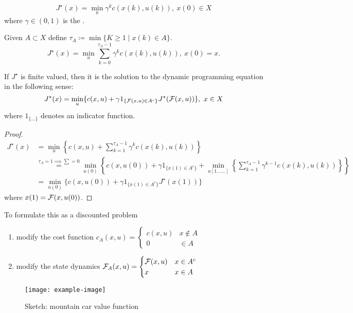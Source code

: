 \[J^\star(x)=\min_{\underbar{u}}\gamma^kc(x(k),u(k)),\ x(0)\in X\]
where \(\gamma\in (0,1)\) is the .

Given \(A\subset X\) define \(\tau_A\coloneqq \min\{K\geq 1\mid x(k)\in A\}\).
\[J^\star(x)=\min_u\sum_{k=0}^{\tau_A-1}\gamma^kc(x(k),u(k)),\ x(0)=x.\]
\begin{proposition}\label{prop:1.18}
    If \(J^\star\) is finite valued, then it is the solution to 
    the dynamic programming equation in the following sense:
    \[J^\star(x)=\min_{u}\{c(x,u)+\gamma1_{\{\mathcal{F}(x,u)\in A^c\}}J^\star(\mathcal{F}(x,u))\},\ x\in X\]
    where \(1_{\{\dots\}}\) denotes an indicator function.
\end{proposition}
\begin{proof}
    \begin{align*}
        J^\star(x)&=\min_{\underbar{u}}\left\{c(x,\underbar{u})+\sum_{k=1}^{\tau_A-1}\gamma^kc(x(k),u(k))\right\}    \\
        &\stackrel{\tau_A=1\implies\sum=0}{=}\min_{u(0)}\left\{c(x,u(0))+\gamma1_{\{x(1)\in A^c\}}+\min_{u[1,\dots,]}\left\{\sum_{k=1}^{\tau_A-1}\gamma^{k-1}c(x(k),u(k))\right\}\right\}\\
        &=\min_{u(0)}\{c(x,u(0))+\gamma1_{\{x(1)\in A^c\}}J^\star(x(1))\}
    \end{align*}
    where \(x(1)=\mathcal{F}(x,u(0))\).
\end{proof}

To formulate this as a discounted problem 
\begin{enumerate}
    \item modify the cost function \(c_A(x,u)=\begin{cases}
        c(x,u) & x\notin A \\
        0 & \in A 
    \end{cases}\)
    \item modify the state dynamics \(\mathcal{F}_A(x,u)=\begin{cases}
        \mathcal{F}(x,u) & x\in A^c \\
        x & x\in A
    \end{cases}\) 
\end{enumerate}

\begin{figure}[H]\label{fig:1.07}
    \centering
    \texttt{[image: example-image]}
    \caption{Sketch: mountain car value function}
\end{figure}


